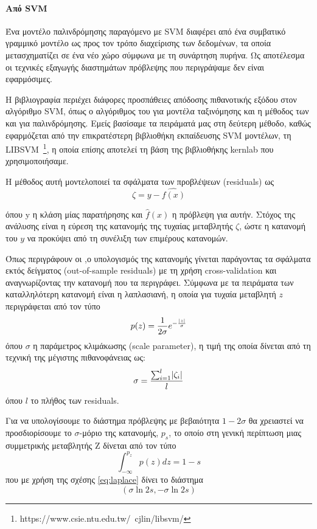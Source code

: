 \paragraph{Από SVM} Ένα μοντέλο παλινδρόμησης παραγόμενο με SVM διαφέρει από ένα συμβατικό γραμμικό μοντέλο ως προς τον τρόπο διαχείρισης των δεδομένων, τα οποία μετασχηματίζει σε ένα νέο χώρο σύμφωνα με τη συνάρτηση πυρήνα. Ως αποτέλεσμα οι τεχνικές εξαγωγής διαστημάτων πρόβλεψης που περιγράψαμε δεν είναι εφαρμόσιμες.

Η βιβλιογραφία περιέχει διάφορες προσπάθειες απόδοσης πιθανοτικής εξόδου στον αλγόριθμο SVM, όπως ο αλγόριθμος του \citet{Platt99probabilisticoutputs} για μοντέλα ταξινόμησης και η μέθοδος των \citet{Jiang:2008:ECI:1390681.1390698} και \citet{Lin04simpleprobabilistic} για παλινδρόμησης. Εμείς βασίσαμε τα πειράματά μας στη δεύτερη μέθοδο, καθώς εφαρμόζεται από την επικρατέστερη βιβλιοθήκη εκπαίδευσης SVM μοντέλων, τη LIBSVM~\footnote{https://www.csie.ntu.edu.tw/~cjlin/libsvm/}, η οποία επίσης αποτελεί τη βάση της βιβλιοθήκης kernlab που χρησιμοποιήσαμε.

Η μέθοδος αυτή μοντελοποιεί τα σφάλματα των προβλέψεων (residuals) ως
\begin{equation}
\zeta = y - \hat{f(x)}
\end{equation}

όπου y η κλάση μίας παρατήρησης και $\hat{f}(x)$ η πρόβλεψη για αυτήν. Στόχος της ανάλυσης είναι η εύρεση της κατανομής της τυχαίας μεταβλητής $\zeta$, ώστε η κατανομή του $y$ να προκύψει από τη συνέλιξη των επιμέρους κατανομών. 

Όπως περιγράφουν οι \citet{Chang:2011:LLS:1961189.1961199} ,ο υπολογισμός της κατανομής γίνεται παράγοντας τα σφάλματα εκτός δείγματος (out-of-sample residuals) με τη χρήση cross-validation και αναγνωρίζοντας την κατανομή που τα περιγράφει. Σύμφωνα με τα πειράματα των \citet{Lin04simpleprobabilistic} καταλληλότερη κατανομή είναι η λαπλασιανή, η οποία για τυχαία μεταβλητή $z$ περιγράφεται από τον τύπο
\begin{equation}
	p(z) = \frac{1}{2\sigma} e^{-\frac{\lvert z\rvert}{\sigma}}
	\label{eq:laplace}
\end{equation} 
όπου $\sigma$ η παράμετρος κλιμάκωσης (scale parameter), η τιμή της οποία δίνεται από τη τεχνική της μέγιστης πιθανοφάνειας ως:
\begin{equation}
\sigma = \frac{\sum_{i=1}^{l} \lvert\zeta_{i}\rvert}{l}
\end{equation}
όπου $l$ το πλήθος των residuals.

Για να υπολογίσουμε το διάστημα πρόβλεψης με βεβαιότητα $1-2\sigma$ θα χρειαστεί να προσδιορίσουμε το $\sigma$-μόριο της κατανομής, $p_s$, το οποίο στη γενική περίπτωση μιας συμμετρικής μεταβλητής Z δίνεται από τον τύπο
\begin{equation}
\int_{-\infty}^{p_z}p(z)dz = 1-s
\end{equation}
που με χρήση της σχέσης \ref{eq:laplace} δίνει το διάστημα
\begin{equation}
	(\sigma \ln{2 s}, -\sigma \ln{2 s})
\end{equation}
